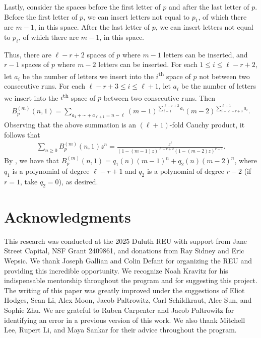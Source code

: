 \documentclass[11pt]{amsart}
\begin{document}
    Lastly, consider the spaces before the first letter of $p$ and after the last letter of $p$. Before the first letter of $p$, we can insert letters not equal to $p_1$, of which there are $m-1$, in this space. After the last letter of $p$, we can insert letters not equal to $p_{\ell}$, of which there are $m-1$, in this space.

    Thus, there are $\ell-r+2$ spaces of $p$ where $m-1$ letters can be inserted, and $r-1$ spaces of $p$ where $m-2$ letters can be inserted. For each $1\leq i\leq \ell-r+2$, let $a_i$ be the number of letters we insert into the $i$\textsuperscript{th} space of $p$ not between two consecutive runs. For each $\ell-r+3\leq i\leq \ell+1$, let $a_i$ be the number of letters we insert into the $i$\textsuperscript{th} space of $p$ between two consecutive runs. Then
    \begin{align*}
        B_p^{(m)}(n,1)=\sum_{a_1+\cdots+a_{\ell+1}=n-\ell}(m-1)^{\sum_{i=1}^{\ell-r+2}a_i}(m-2)^{\sum_{i=\ell-r+3}^{\ell+1}a_i}.
    \end{align*}
    Observing that the above summation is an $(\ell+1)$-fold Cauchy product, it follows that
    \begin{align*}
        \sum_{n\geq0} B_p^{(m)}(n,1) z^n=\frac{z^{\ell}}{(1-(m-1)z)^{\ell-r+2}(1-(m-2)z)^{r-1}}.
    \end{align*}
    By \cite[Theorem IV.9]{analytic_combo}, we have that $B_p^{(m)}(n,1)=q_1(n)(m-1)^n+q_2(n)(m-2)^n$, where $q_1$ is a polynomial of degree $\ell-r+1$ and $q_2$ is a polynomial of degree $r-2$ (if $r=1$, take $q_2=0$), as desired.


\section*{Acknowledgments}
This research was conducted at the 2025 Duluth REU with support from Jane Street Capital, NSF Grant 2409861, and donations from Ray Sidney and Eric Wepsic. We thank Joseph Gallian and Colin Defant for organizing the REU and providing this incredible opportunity. We recognize Noah Kravitz for his indispensable mentorship throughout the program and for suggesting this project. The writing of this paper was greatly improved under the suggestions of Eliot Hodges, Sean Li, Alex Moon, Jacob Paltrowitz, Carl Schildkraut, Alec Sun, and Sophie Zhu. We are grateful to Ruben Carpenter and Jacob Paltrowitz for identifying an error in a previous version of this work. We also thank Mitchell Lee, Rupert Li, and Maya Sankar for their advice throughout the program.
\end{document}
